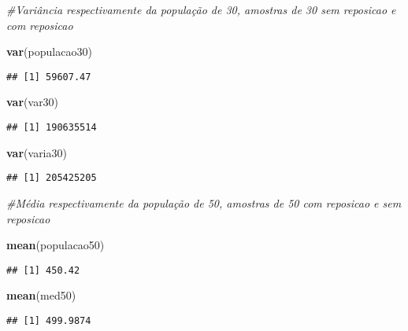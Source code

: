 \documentclass[]{article}
\newenvironment{Shaded}{\begin{snugshade}}{\end{snugshade}}
\newcommand{\KeywordTok}[1]{\textcolor[rgb]{0.13,0.29,0.53}{\textbf{#1}}}
\newcommand{\CommentTok}[1]{\textcolor[rgb]{0.56,0.35,0.01}{\textit{#1}}}
\newcommand{\NormalTok}[1]{#1}
\begin{document}
\begin{Shaded}
\begin{Highlighting}[]
 \CommentTok{#Variância respectivamente da população de 30, amostras de 30 sem reposicao e com reposicao}

\KeywordTok{var}\NormalTok{(populacao30)}
\end{Highlighting}
\end{Shaded}

\begin{verbatim}
## [1] 59607.47
\end{verbatim}

\begin{Shaded}
\begin{Highlighting}[]
\KeywordTok{var}\NormalTok{(var30)}
\end{Highlighting}
\end{Shaded}

\begin{verbatim}
## [1] 190635514
\end{verbatim}

\begin{Shaded}
\begin{Highlighting}[]
\KeywordTok{var}\NormalTok{(varia30)}
\end{Highlighting}
\end{Shaded}

\begin{verbatim}
## [1] 205425205
\end{verbatim}

\begin{Shaded}
\begin{Highlighting}[]
 \CommentTok{#Média respectivamente da população de 50, amostras de 50 com reposicao e sem reposicao}

\KeywordTok{mean}\NormalTok{(populacao50)}
\end{Highlighting}
\end{Shaded}

\begin{verbatim}
## [1] 450.42
\end{verbatim}

\begin{Shaded}
\begin{Highlighting}[]
\KeywordTok{mean}\NormalTok{(med50)}
\end{Highlighting}
\end{Shaded}

\begin{verbatim}
## [1] 499.9874
\end{verbatim}
\end{document}
